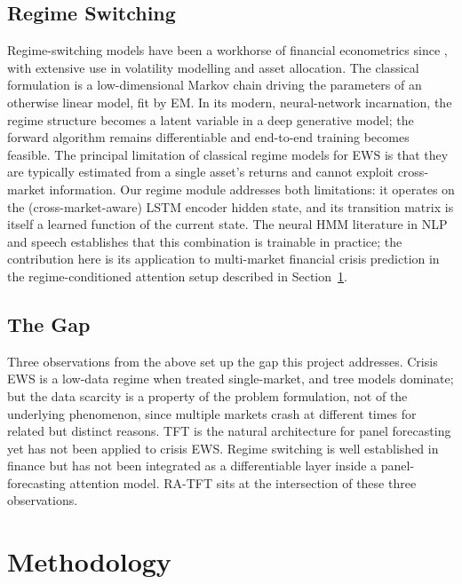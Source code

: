 \documentclass[11pt,a4paper]{article}
\begin{document}
\subsection{Regime Switching}
Regime-switching models have been a workhorse of financial econometrics
since \citet{hamilton1989new}, with extensive use in volatility modelling
\citep{angbekaert2002regime} and asset allocation. The classical
formulation is a low-dimensional Markov chain driving the parameters of an
otherwise linear model, fit by EM. In its modern, neural-network
incarnation, the regime structure becomes a latent variable in a deep
generative model; the forward algorithm remains differentiable and
end-to-end training becomes feasible. The principal limitation of classical
regime models for EWS is that they are typically estimated from a single
asset's returns and cannot exploit cross-market information. Our regime
module addresses both limitations: it operates on the (cross-market-aware)
LSTM encoder hidden state, and its transition matrix is itself a learned
function of the current state. The neural HMM literature in NLP and speech
\citep{tran2016unsupervised} establishes that this combination is trainable
in practice; the contribution here is its application to multi-market
financial crisis prediction in the regime-conditioned attention setup
described in Section~\ref{sec:method}.

\subsection{The Gap}
Three observations from the above set up the gap this project addresses.
Crisis EWS is a low-data regime when treated single-market, and tree models
dominate; but the data scarcity is a property of the problem formulation,
not of the underlying phenomenon, since multiple markets crash at different
times for related but distinct reasons. TFT is the natural architecture for
panel forecasting yet has not been applied to crisis EWS. Regime switching
is well established in finance but has not been integrated as a
differentiable layer inside a panel-forecasting attention model. RA-TFT sits
at the intersection of these three observations.

\section{Methodology}
\label{sec:method}
\end{document}
